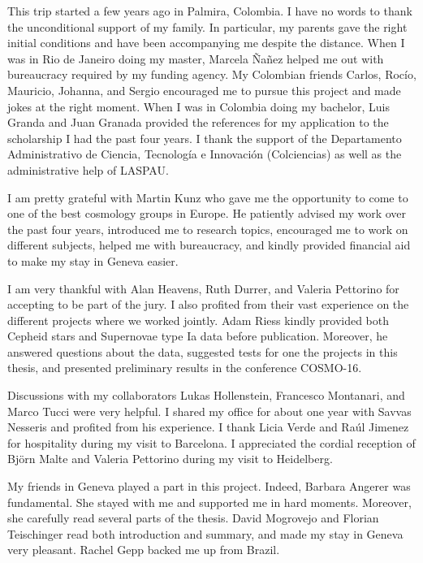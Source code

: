 \documentclass[12pt]{report}
\renewcommand{\(}{\left(}
\renewcommand{\)}{\right)}
\renewcommand{\[}{\left[}
\renewcommand{\]}{\right]}
\begin{document}
\vspace{3mm}

This trip started a few years ago in Palmira, Colombia. I have no words to thank the unconditional support of my family. In particular, my parents gave the right initial conditions and have been accompanying me despite the distance. When I was in Rio de Janeiro doing my master, Marcela \~{N}a\~{n}ez helped me out with bureaucracy required by my funding agency. My Colombian friends Carlos, Roc\'{i}o, Mauricio, Johanna, and Sergio encouraged me to pursue this project and made jokes at the right moment. When I was in Colombia doing my bachelor, Luis Granda and Juan Granada provided the references for my application to the scholarship I had the past four years. I thank the support of the Departamento Administrativo de Ciencia, Tecnolog\'{i}a e Innovaci\'{o}n (Colciencias) as well as the administrative help of LASPAU.  

I am pretty grateful with Martin Kunz who gave me the opportunity to come to one of the best cosmology groups in Europe. He patiently advised my work over the past four years, introduced me to research topics, encouraged me to work on different subjects, helped me with bureaucracy, and kindly provided financial aid to make my stay in Geneva easier.  

I am very thankful with Alan Heavens, Ruth Durrer, and Valeria Pettorino  for accepting to be part of the jury. I also  profited from their vast experience on the different projects where we worked jointly. Adam Riess kindly provided both Cepheid stars and Supernovae type Ia data before publication. Moreover, he answered questions about the data, suggested tests for one the projects in this thesis, and presented preliminary results in the conference COSMO-16.

Discussions with my collaborators Lukas Hollenstein, Francesco Montanari, and Marco Tucci were very helpful. I shared my office for about one year with Savvas Nesseris and profited from his experience. I thank Licia Verde and Ra\'{u}l Jimenez for hospitality during my visit to Barcelona. I appreciated the cordial reception of Bj\"{o}rn Malte and Valeria Pettorino during my visit to Heidelberg. 

My friends in Geneva played a part in this project. Indeed, Barbara Angerer was fundamental. She stayed with me and supported me in hard moments. Moreover, she carefully read several parts of the thesis. David Mogrovejo and Florian Teischinger read both introduction and summary, and made my stay in Geneva very pleasant. Rachel Gepp backed me up from Brazil. 
\end{document}
